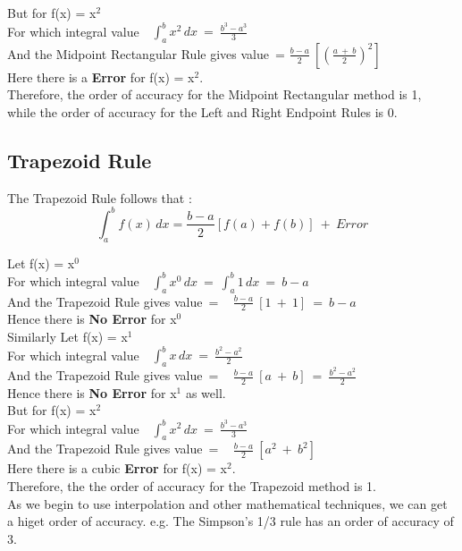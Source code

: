 \documentclass[11pt]{article}
\begin{document}
But for f(x) = x$^2$\\
For which integral value~~$\int_{a}^{b} x^2 \,dx~=~\frac{b^3-a^3}{3}$\\
And the Midpoint Rectangular Rule gives value~= $\frac{b-a}{2}~[(\frac{a~+~b}{2})^2]$\\
Here there is a \textbf{ Error} for f(x) = x$^2$.\\

Therefore, the order of accuracy for the Midpoint Rectangular method is 1,\\
while the order of accuracy for the Left and Right Endpoint Rules is 0.
\subsection{Trapezoid Rule}
The Trapezoid Rule follows that : 
\[ \int_{a}^{b}f(x) \,dx = \frac{b-a}{2}[f(a)+f(b)]~+~Error\]

Let f(x) = x$^0$\\
For which integral value~~$\int_{a}^{b} x^0 \,dx~=~\int_{a}^{b} 1 \,dx~=~ b-a$\\
And the Trapezoid Rule gives value~= ~ $\frac{b-a}{2}~[1~+~1]~=~b-a$\\
Hence there is \textbf{No Error} for x$^0$ \\

Similarly Let f(x) = x$^1$\\
For which integral value~~$\int_{a}^{b} x \,dx~=~\frac{b^2-a^2}{2}$\\
And the Trapezoid Rule gives value~= ~ $\frac{b-a}{2}~[a~+~b]~=~\frac{b^2-a^2}{2}$\\
Hence there is \textbf{No Error} for x$^1$ as well.\\

But for f(x) = x$^2$\\
For which integral value~~$\int_{a}^{b} x^2 \,dx~=~\frac{b^3-a^3}{3}$\\
And the Trapezoid Rule gives value~= ~ $\frac{b-a}{2}~[a^2~+~b^2]$\\
Here there is a cubic\textbf{ Error} for f(x) = x$^2$.\\

Therefore, the the order of accuracy for the Trapezoid method is 1.\\

As we begin to use interpolation and other mathematical techniques, we can get a higet order of accuracy. e.g. The Simpson's 1/3 rule has an order of accuracy of 3.\\
\end{document}
